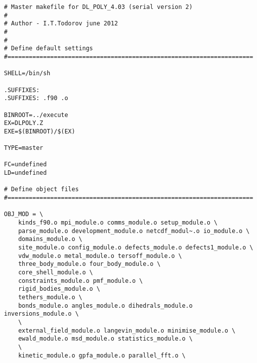 \begin{verbatim}
# Master makefile for DL_POLY_4.03 (serial version 2)
#
# Author - I.T.Todorov june 2012
#
#
# Define default settings
#=====================================================================

SHELL=/bin/sh

.SUFFIXES:
.SUFFIXES: .f90 .o

BINROOT=../execute
EX=DLPOLY.Z
EXE=$(BINROOT)/$(EX)

TYPE=master

FC=undefined
LD=undefined

# Define object files
#=====================================================================

OBJ_MOD = \
	kinds_f90.o mpi_module.o comms_module.o setup_module.o \
	parse_module.o development_module.o netcdf_modul~.o io_module.o \
	domains_module.o \
	site_module.o config_module.o defects_module.o defects1_module.o \
	vdw_module.o metal_module.o tersoff_module.o \
	three_body_module.o four_body_module.o \
	core_shell_module.o \
	constraints_module.o pmf_module.o \
	rigid_bodies_module.o \
	tethers_module.o \
	bonds_module.o angles_module.o dihedrals_module.o inversions_module.o \
	\
	external_field_module.o langevin_module.o minimise_module.o \
	ewald_module.o msd_module.o statistics_module.o \
	\
	kinetic_module.o gpfa_module.o parallel_fft.o \


\end{verbatim}
